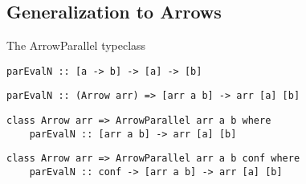 \subsection{Generalization to Arrows}


\begin{frame}[fragile]{The ArrowParallel typeclass}
\begin{lstlisting}[frame=htrbl]
parEvalN :: [a -> b] -> [a] -> [b]
\end{lstlisting}

\begin{lstlisting}[frame=htrbl]
parEvalN :: (Arrow arr) => [arr a b] -> arr [a] [b]
\end{lstlisting}

\begin{lstlisting}[frame=htrbl]
class Arrow arr => ArrowParallel arr a b where
	parEvalN :: [arr a b] -> arr [a] [b]
\end{lstlisting}
\begin{lstlisting}[frame=htrbl]
class Arrow arr => ArrowParallel arr a b conf where
	parEvalN :: conf -> [arr a b] -> arr [a] [b]
\end{lstlisting}

\end{frame}

